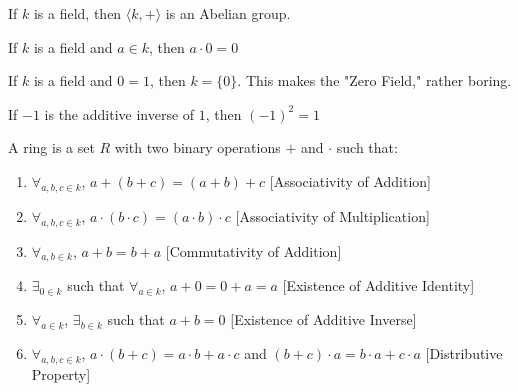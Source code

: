 \documentclass[crop=false,class=article,oneside]{standalone}
\begin{document}
            \begin{theorem}
                If $k$ is a field, then
                $\langle k,+ \rangle$ is an Abelian group.
            \end{theorem}
            \begin{theorem}
                If $k$ is a field and $a\in k$,
                then $a\cdot 0=0$
            \end{theorem}
            \begin{remark}
                If $k$ is a field and $0=1$, then $k=\{0\}$.
                This makes the "Zero Field," rather boring.
            \end{remark}
            \begin{theorem}
                If $-1$ is the additive inverse of $1$,
                then $(-1)^2=1$
            \end{theorem}
            \begin{definition}
                A ring is a set $R$ with two binary
                operations $+$ and $\cdot$ such that:
                \begin{enumerate}
                    \item $\forall_{a,b,c\in k}$,
                          $a+(b+c)=(a+b)+c$
                          \hfill[Associativity of Addition]
                    \item $\forall_{a,b,c\in k}$,
                          $a\cdot(b\cdot c)=(a\cdot b)\cdot c$
                          \hfill[Associativity of Multiplication]
                    \item $\forall_{a,b\in k}$,
                          $a+b=b+a$
                          \hfill[Commutativity of Addition]
                    \item $\exists_{0 \in k}$ such that
                          $\forall_{a\in k}$,
                          $a+0=0+a=a$
                          \hfill[Existence of Additive Identity]
                    \item $\forall_{a\in k}$,
                          $\exists_{b\in k}$ such that $a+b=0$
                          \hfill[Existence of Additive Inverse]
                    \item $\forall_{a,b,c\in k}$,
                          $a\cdot(b+c)=a\cdot b+a\cdot c$
                          and $(b+c)\cdot a=b\cdot a+c\cdot a$
                          \hfill [Distributive Property]
                \end{enumerate}
            \end{definition}
\end{document}
